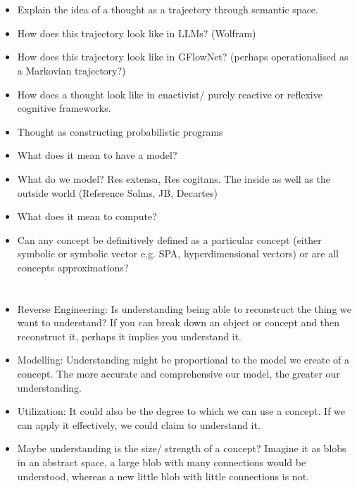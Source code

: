 \section{}
\begin{itemize}
    \item Explain the idea of a thought as a trajectory through semantic space. 
    \item How does this trajectory look like in LLMs? (Wolfram)
    \item How does this trajectory look like in GFlowNet? (perhaps operationalised as a Markovian trajectory?)
    \item How does a thought look like in enactivist/ purely reactive or reflexive cognitive frameworks. 
    \item Thought as constructing probabilistic programs
    \item What does it mean to have a model?
    \item What do we model? Res extensa, Res cogitans. The inside as well as the outside world (Reference Solms, JB, Decartes)
    \item What does it mean to compute?
    \item Can any concept be definitively defined as a particular concept (either symbolic or symbolic vector e.g. SPA, hyperdimensional vectors) or are all concepts approximations?
\end{itemize}













\section{}
\subsubsection{}
\begin{itemize}
    \item Reverse Engineering: Is understanding being able to reconstruct the thing we want to understand? If you can break down an object or concept and then reconstruct it, perhaps it implies you understand it.
    \item Modelling: Understanding might be proportional to the model we create of a concept. The more accurate and comprehensive our model, the greater our understanding.
    \item Utilization: It could also be the degree to which we can use a concept. If we can apply it effectively, we could claim to understand it.
    \item Maybe understanding is the size/ strength of a concept? Imagine it as blobs in an abstract space, a large blob with many connections would be understood, whereas a new little blob with little connections is not. 
\end{itemize}



